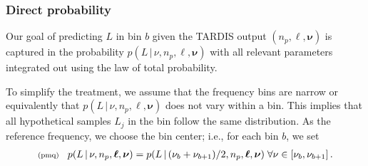 \documentclass[11pt]{article}
\newcommand{\fred}[1]{\todo[color=orange!40,inline]{#1}} %
\newcommand{\lleq}[1]{\label{#1} }
\renewcommand{\lleq}[1]{\label{#1} {\scriptstyle {\rm (#1)}} \hspace*{2ex} }
\newcommand{\cond}{\,|\,}
\newcommand{\bml}{{\bm{\ell}}}
\newcommand{\bmphi}{{\bm{\phi}}}
\newcommand{\bmnu}{{\bm{\nu}}}
\newcommand{\npack}{n_p}
\begin{document}
\subsubsection{Direct probability}



Our goal of predicting $L$ in bin $b$ given the TARDIS output
$(\npack,\bml, \bmnu)$ is captured in the probability $p(L\cond \nu,
\npack,\bml, \bmnu)$ with all relevant parameters integrated out using
the law of total probability.

To simplify the treatment, we assume that the frequency bins are
narrow or equivalently that $p(L \cond \nu, \npack, \bml, \bmnu)$ does
not vary within a bin. This implies that all hypothetical samples
$L_j$ in the bin follow the same distribution.  As the reference
frequency, we choose the bin center;
i.e., for each bin $b$, we set
\begin{align}
  \lleq{pmq}
  p(L\cond \nu, \npack,\bml, \bmnu) = p(L\cond (\nu_b + \nu_{b+1}) / 2, \npack,\bml, \bmnu)  \; \forall \nu \in [\nu_b, \nu_{b+1}] \, .
\end{align}
\end{document}
